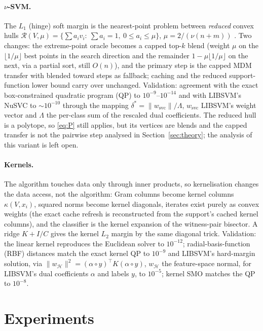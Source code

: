 \documentclass[pdflatex,sn-apa]{sn-jnl}%
\theoremstyle{thmstyleone}
\theoremstyle{thmstyletwo}
\newcommand{\norm}[1]{\lVert #1 \rVert}
\begin{document}
\paragraph{$\nu$-SVM.} The $L_1$ (hinge) soft margin is the nearest-point
problem between \emph{reduced} convex hulls \citep{bennett2000duality}
$\mathcal R(V,\mu)=\{\sum a_iv_i:\ \sum a_i=1,\ 0\le a_i\le\mu\}$,
$\mu=2/(\nu(n+m))$ \citep{crisp2000,mavroforakis2006}. Two changes: the
extreme-point oracle becomes a capped top-$k$ blend (weight $\mu$ on the
$\lfloor1/\mu\rfloor$ best points in the search direction and the
remainder $1-\mu\lfloor1/\mu\rfloor$ on the next, via a partial sort,
still $O(n)$), and the primary step is the capped MDM transfer with
blended toward steps as fallback; caching and the reduced
support-function lower bound carry over unchanged. Validation: agreement
with the exact box-constrained quadratic program (QP) to $10^{-9}$--$10^{-14}$ and with
LIBSVM's NuSVC to $\sim10^{-10}$ through the mapping
$\delta^*=\norm{w_{\mathrm{svc}}}/\Lambda$, $w_{\mathrm{svc}}$ LIBSVM's
weight vector and $\Lambda$ the per-class
sum of the rescaled dual coefficients. The reduced hull is a polytope, so
\eqref{eq:P} still applies, but its vertices are blends and the capped
transfer is not the pairwise step analysed in Section~\ref{sec:theory}; the
analysis of this variant is left open.

\paragraph{Kernels.} The algorithm touches data only through inner
products, so kernelisation changes the data access, not the algorithm: Gram columns
become kernel columns $\kappa(V,x_i)$, squared norms become kernel
diagonals,
iterates exist purely as convex weights (the exact cache refresh is
reconstructed from the support's cached kernel columns), and the
classifier is the kernel expansion of the witness-pair bisector. A ridge
$K+I/C$ gives the kernel $L_2$ margin by the same diagonal trick.
Validation: the linear kernel reproduces the Euclidean solver to
$10^{-12}$; radial-basis-function (RBF) distances match the exact kernel QP to $10^{-9}$ and
LIBSVM's hard-margin solution, via
$\norm{w_{\mathcal H}}^2=(\alpha\circ y)^\top K(\alpha\circ y)$, $w_{\mathcal H}$ the
feature-space normal, for
LIBSVM's dual coefficients $\alpha$ and labels $y$, to $10^{-5}$;
kernel SMO matches the QP to $10^{-8}$.

\section{Experiments}\label{sec:exp}
\end{document}

